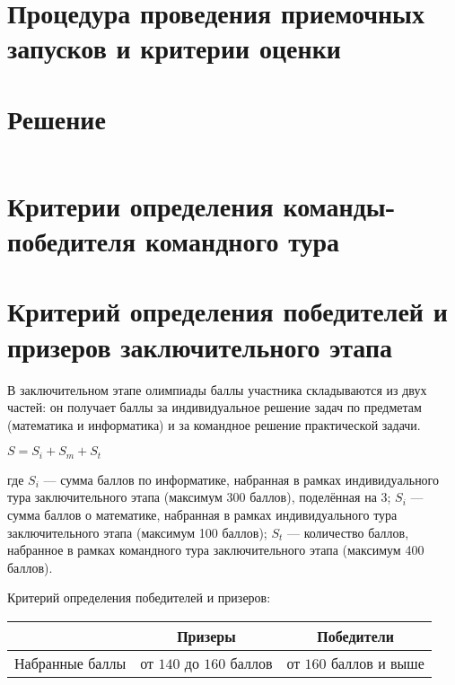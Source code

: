 \section{Процедура проведения приемочных запусков и
критерии оценки}



\section{Решение}
\inputminted[fontsize=\footnotesize, linenos]{js}{final/command_tour/irs/solution.js}

\section{Критерии определения команды-победителя командного тура}


\section{Критерий определения победителей и призеров
заключительного этапа}

В заключительном этапе олимпиады баллы участника складываются
из двух частей: он получает баллы за индивидуальное решение задач по
предметам (математика и информатика) и за командное решение
практической задачи.

\begin{center}
    $S = S_i + S_m + S_t$
\end{center}

где $S_i$ --- сумма баллов по информатике, набранная в рамках индивидуального
тура заключительного этапа (максимум 300 баллов), поделённая на 3; $S_i$ ---
сумма баллов о математике, набранная в рамках индивидуального тура
заключительного этапа (максимум 100 баллов); $S_t$ --- количество баллов,
набранное в рамках командного тура заключительного этапа (максимум
400 баллов).

Критерий определения победителей и призеров:

\begin{center}
\begin{tabular}{ |c|c|c| }
 \hline
  & \textbf{Призеры} & \textbf{Победители} \\
 \hline
 Набранные баллы & от $140$ до $160$ баллов & от $160$ баллов и выше  \\
 \hline
\end{tabular}
\end{center}
